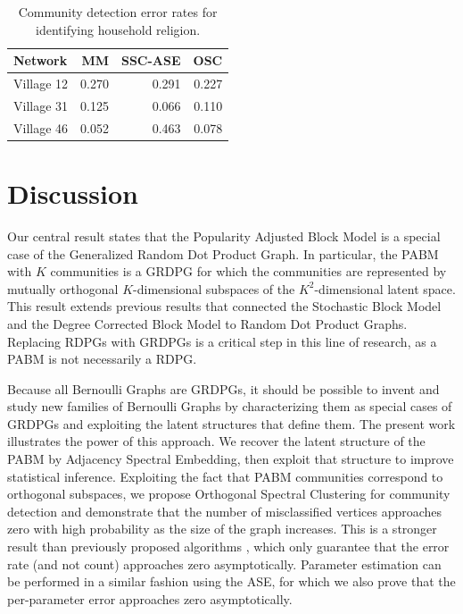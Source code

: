 \documentclass[12pt]{article}
\begin{document}
\begin{table}
\centering
\begin{tabular}[t]{l|r|r|r}
\hline
Network & MM & SSC-ASE & OSC\\
\hline
Village 12 & 0.270 & 0.291 & 0.227\\
\hline
Village 31 & 0.125 & 0.066 & 0.110\\
\hline
Village 46 & 0.052 & 0.463 & 0.078\\
\hline
\end{tabular}
\caption{\label{tab:households-table}Community detection error rates for identifying household religion.}
\end{table}

\hypertarget{discussion}{%
\section{Discussion}\label{discussion}}

Our central result states that the Popularity Adjusted Block Model 
is a special case of the Generalized Random Dot Product Graph. 
In particular, the PABM with $K$ communities is a GRDPG 
for which the communities are represented by 
mutually orthogonal $K$-dimensional subspaces 
of the $K^2$-dimensional latent space. 
This result extends previous results that connected 
the Stochastic Block Model and the Degree Corrected Block Model 
to Random Dot Product Graphs. 
Replacing RDPGs with GRDPGs is a critical step in this line of research, 
as a PABM is not necessarily a RDPG. 

Because all Bernoulli Graphs are GRDPGs, it should be possible to
invent and study new families of Bernoulli Graphs by characterizing
them as special cases of GRDPGs and exploiting the latent structures
that define them.  The present work illustrates the power of this
approach.  We recover the latent structure of the PABM by Adjacency
Spectral Embedding, then exploit that structure to improve statistical
inference.  Exploiting the fact that PABM communities correspond to
orthogonal subspaces, we propose Orthogonal Spectral Clustering for
community detection and demonstrate that the number of misclassified
vertices approaches zero with high probability as the size of the
graph increases.  This is a stronger result than previously proposed
algorithms \citep{307cbeb9b1be48299388437423d94bf1}, which only
guarantee that the error rate (and not count) approaches zero
asymptotically.  Parameter estimation can be performed in a similar
fashion using the ASE, for which we also prove that the per-parameter
error approaches zero asymptotically.
\end{document}
